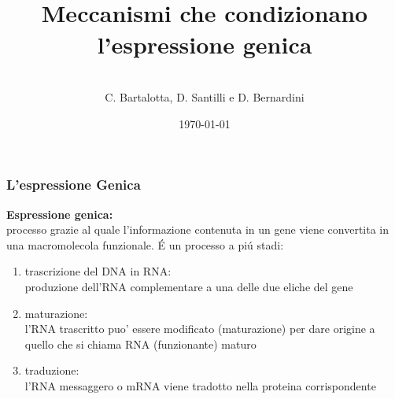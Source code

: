 \documentclass[hyperref={pdfpagelabels=false}]{beamer}
\title{\\Meccanismi che condizionano l'espressione genica\\}
\author{\\ C. Bartalotta, D. Santilli e D. Bernardini}
\date{\today}
\begin{document}


\begin{frame}
\titlepage
\end{frame}



\begin{frame}\frametitle{L'espressione Genica}
\textbf{Espressione genica:}\\
processo grazie al quale l'informazione contenuta in un gene viene convertita in una macromolecola funzionale.
\'E un processo a pi\'u stadi:\pause 
\begin{enumerate}
\item trascrizione del DNA in RNA:\\
produzione dell'RNA complementare a una delle due eliche del gene  \pause 
\item maturazione:\\
l'RNA trascritto puo' essere modificato (maturazione) per dare origine a quello che si chiama RNA (funzionante) maturo \pause 
\item traduzione:\\
l'RNA messaggero o mRNA viene tradotto nella proteina corrispondente
\end{enumerate}
\end{frame}
\end{document}
